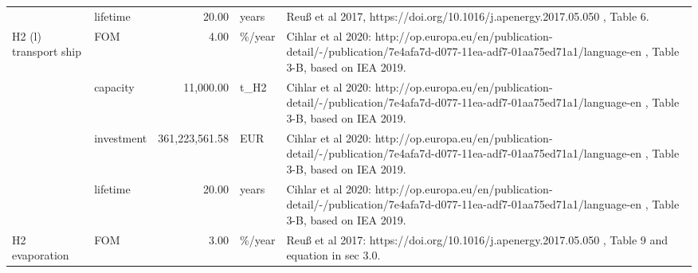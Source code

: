 \begin{longtable}{p{5cm}p{3cm}rp{3cm}p{11cm}}
                      & lifetime &          20.00 &                             years &                                                                                                                                                                                                                                                           Reuß et al 2017, https://doi.org/10.1016/j.apenergy.2017.05.050 , Table 6. \\
H2 (l) transport ship & FOM &           4.00 &                            \%/year &                                                                                                                                                                          Cihlar et al 2020: http://op.europa.eu/en/publication-detail/-/publication/7e4afa7d-d077-11ea-adf7-01aa75ed71a1/language-en , Table 3-B, based on IEA 2019. \\
                      & capacity &      11,000.00 &                              t\_H2 &                                                                                                                                                                          Cihlar et al 2020: http://op.europa.eu/en/publication-detail/-/publication/7e4afa7d-d077-11ea-adf7-01aa75ed71a1/language-en , Table 3-B, based on IEA 2019. \\
                      & investment & 361,223,561.58 &                               EUR &                                                                                                                                                                          Cihlar et al 2020: http://op.europa.eu/en/publication-detail/-/publication/7e4afa7d-d077-11ea-adf7-01aa75ed71a1/language-en , Table 3-B, based on IEA 2019. \\
                      & lifetime &          20.00 &                             years &                                                                                                                                                                          Cihlar et al 2020: http://op.europa.eu/en/publication-detail/-/publication/7e4afa7d-d077-11ea-adf7-01aa75ed71a1/language-en , Table 3-B, based on IEA 2019. \\
H2 evaporation & FOM &           3.00 &                            \%/year &                                                                                                                                                                                                                                   Reuß et al 2017: https://doi.org/10.1016/j.apenergy.2017.05.050 , Table 9 and equation in sec 3.0. \\

\end{longtable}

